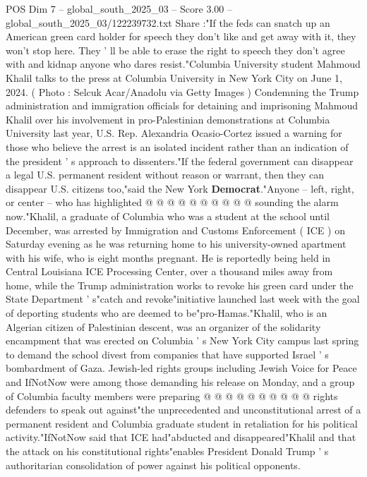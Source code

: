 \begin{textsample}{POS Dim 7 – global\_south\_2025\_03 – Score 3.00 – global\_south\_2025\_03/122239732.txt}  \label{ex:f7_pos_429}
Share :"If the feds can snatch up an American green card holder for speech they don't like and get away with it, they won't stop here.
They ' ll be able to erase the right to speech they don't agree with and kidnap anyone who dares resist."Columbia University student Mahmoud Khalil talks to the press at Columbia University in New York City on June 1, 2024. ( Photo : Selcuk Acar/Anadolu via Getty Images ) Condemning the Trump administration and immigration officials for detaining and imprisoning Mahmoud Khalil over his involvement in pro-Palestinian demonstrations at Columbia University last year, U.S.
Rep.
Alexandria Ocasio-Cortez issued a warning for those who believe the arrest is an isolated incident rather than an indication of the president ' s approach to dissenters."If the federal government can disappear a legal U.S. permanent resident without reason or warrant, then they can disappear U.S. citizens too,"said the New York \textbf{Democrat}."Anyone -- left, right, or center -- who has highlighted @ @ @ @ @ @ @ @ @ @ sounding the alarm now."Khalil, a graduate of Columbia who was a student at the school until December, was arrested by Immigration and Customs Enforcement ( ICE ) on Saturday evening as he was returning home to his university-owned apartment with his wife, who is eight months pregnant.
He is reportedly being held in Central Louisiana ICE Processing Center, over a thousand miles away from home, while the Trump administration works to revoke his green card under the State Department ' s"catch and revoke"initiative launched last week with the goal of deporting students who are deemed to be"pro-Hamas."Khalil, who is an Algerian citizen of Palestinian descent, was an organizer of the solidarity encampment that was erected on Columbia ' s New York City campus last spring to demand the school divest from companies that have supported Israel ' s bombardment of Gaza.
Jewish-led rights groups including Jewish Voice for Peace and IfNotNow were among those demanding his release on Monday, and a group of Columbia faculty members were preparing @ @ @ @ @ @ @ @ @ @ rights defenders to speak out against"the unprecedented and unconstitutional arrest of a permanent resident and Columbia graduate student in retaliation for his political activity."IfNotNow said that ICE had"abducted and disappeared"Khalil and that the attack on his constitutional rights"enables President Donald Trump ' s authoritarian consolidation of power against his political opponents.

\end{textsample}
